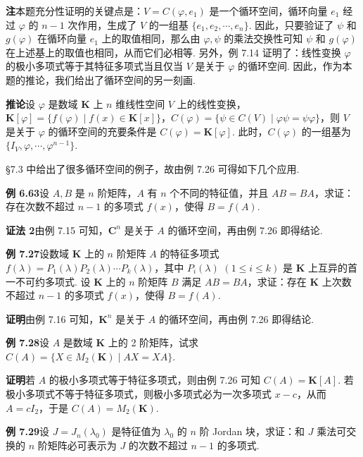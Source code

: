 \documentclass[UTF8,12pt,a4paper,fontset=fandol]{ctexart}
\begin{document}
\noindent\textbf{注}\quad 本题充分性证明的关键点是：$V=C(\varphi,e_1)$ 是一个循环空间，循环向量 $e_1$ 经过 $\varphi$ 的 $n-1$ 次作用，生成了 $V$ 的一组基 $\{e_1,e_2,\cdots,e_n\}$. 因此，只要验证了 $\psi$ 和 $g(\varphi)$ 在循环向量 $e_1$ 上的取值相同，那么由 $\varphi,\psi$ 的乘法交换性可知 $\psi$ 和 $g(\varphi)$ 在上述基上的取值也相同，从而它们必相等. 另外，例 7.14 证明了：线性变换 $\varphi$ 的极小多项式等于其特征多项式当且仅当 $V$ 是关于 $\varphi$ 的循环空间. 因此，作为本题的推论，我们给出了循环空间的另一刻画.

\noindent\textbf{推论}\quad 设 $\varphi$ 是数域 $\mathbf{K}$ 上 $n$ 维线性空间 $V$ 上的线性变换，$\mathbf{K}[\varphi]=\{f(\varphi)\mid f(x)\in\mathbf{K}[x]\}$，$C(\varphi)=\{\psi\in C(V)\mid \varphi\psi=\psi\varphi\}$，则 $V$ 是关于 $\varphi$ 的循环空间的充要条件是 $C(\varphi)=\mathbf{K}[\varphi]$. 此时，$C(\varphi)$ 的一组基为 $\{I_V,\varphi,\cdots,\varphi^{n-1}\}$.

§7.3 中给出了很多循环空间的例子，故由例 7.26 可得如下几个应用.

\noindent\textbf{例 6.63}\quad 设 $A,B$ 是 $n$ 阶矩阵，$A$ 有 $n$ 个不同的特征值，并且 $AB=BA$，求证：存在次数不超过 $n-1$ 的多项式 $f(x)$，使得 $B=f(A)$.

\noindent\textbf{证法 2}\quad 由例 7.15 可知，$\mathbf{C}^n$ 是关于 $A$ 的循环空间，再由例 7.26 即得结论.

\noindent\textbf{例 7.27}\quad 设数域 $\mathbf{K}$ 上的 $n$ 阶矩阵 $A$ 的特征多项式 $f(\lambda)=P_1(\lambda)P_2(\lambda)\cdots P_k(\lambda)$，其中 $P_i(\lambda)$ $(1\le i\le k)$ 是 $\mathbf{K}$ 上互异的首一不可约多项式. 设 $\mathbf{K}$ 上的 $n$ 阶矩阵 $B$ 满足 $AB=BA$，求证：存在 $\mathbf{K}$ 上次数不超过 $n-1$ 的多项式 $f(x)$，使得 $B=f(A)$.

\noindent\textbf{证明}\quad 由例 7.16 可知，$\mathbf{K}^n$ 是关于 $A$ 的循环空间，再由例 7.26 即得结论.

\noindent\textbf{例 7.28}\quad 设 $A$ 是数域 $\mathbf{K}$ 上的 2 阶矩阵，试求 $C(A)=\{X\in M_2(\mathbf{K})\mid AX=XA\}$.

\noindent\textbf{证明}\quad 若 $A$ 的极小多项式等于特征多项式，则由例 7.26 可知 $C(A)=\mathbf{K}[A]$. 若极小多项式不等于特征多项式，则极小多项式必为一次多项式 $x-c$，从而 $A=cI_2$，于是 $C(A)=M_2(\mathbf{K})$.

\noindent\textbf{例 7.29}\quad 设 $J=J_n(\lambda_0)$ 是特征值为 $\lambda_0$ 的 $n$ 阶 Jordan 块，求证：和 $J$ 乘法可交换的 $n$ 阶矩阵必可表示为 $J$ 的次数不超过 $n-1$ 的多项式.
\end{document}
